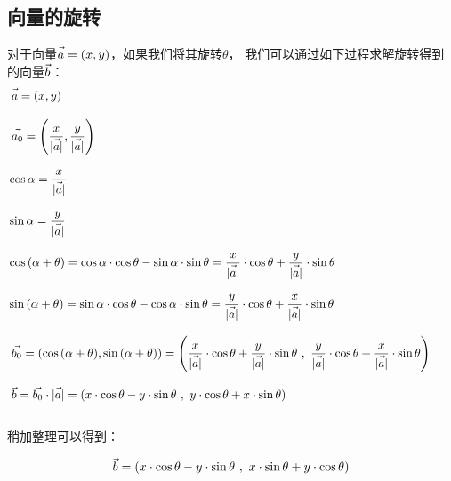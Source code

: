 \documentclass[UTF8]{ctexart}
\let\nvec\vec
\def\vec#1{\nvec{\vphantom b\smash{#1}}}
\begin{document}
\subsection{向量的旋转}
    对于向量$\vec{a}=(x,y)$，如果我们将其旋转$\theta$，
    我们可以通过如下过程求解旋转得到的向量$\vec{b}$：\\
    \setcounter{equation}{0}
    \begin{align}
        &~\vec{a}=(x,y)\\[3mm]
        &~\vec{a_0}=\left(\frac{x}{|\vec{a}|},\frac{y}{|\vec{a}|}\right)\\[3mm]
        &\cos{\alpha}=\frac{x}{|\vec{a}|}\\[3mm]
        &\sin{\alpha}=\frac{y}{|\vec{a}|}\\[3mm]
        &\cos{(\alpha+\theta)}=\cos{\alpha}\cdot\cos{\theta}-\sin{\alpha}\cdot\sin{\theta}
        =\frac{x}{|\vec{a}|}\cdot\cos{\theta}+\frac{y}{|\vec{a}|}\cdot\sin{\theta}\\[3mm]
        &\sin{(\alpha+\theta)}=\sin{\alpha}\cdot\cos{\theta}-\cos{\alpha}\cdot\sin{\theta}
        =\frac{y}{|\vec{a}|}\cdot\cos{\theta}+\frac{x}{|\vec{a}|}\cdot\sin{\theta}\\[3mm]
        &~\vec{b_0}=\left(\cos{(\alpha+\theta)},\sin{(\alpha+\theta)}\right)
        =\left(\frac{x}{|\vec{a}|}\cdot\cos{\theta}+\frac{y}{|\vec{a}|}\cdot\sin{\theta}\ ,\ \frac{y}{|\vec{a}|}\cdot\cos{\theta}+\frac{x}{|\vec{a}|}\cdot\sin{\theta}\right)\qquad\\[3mm]
        &~\vec{b}=\vec{b_0}\cdot|\vec{a}|=\left(x\cdot\cos{\theta}-y\cdot\sin{\theta}\ ,\  y\cdot\cos{\theta}+x\cdot\sin{\theta}\right)
    \end{align}\\
    稍加整理可以得到：
    \begin{large}
    \begin{equation*}
        \vec{b}=\left(x\cdot\cos{\theta}-y\cdot\sin{\theta}\ ,\  x\cdot\sin{\theta}+y\cdot\cos{\theta}\right)
    \end{equation*}
    \end{large}

\newpage
\end{document}
